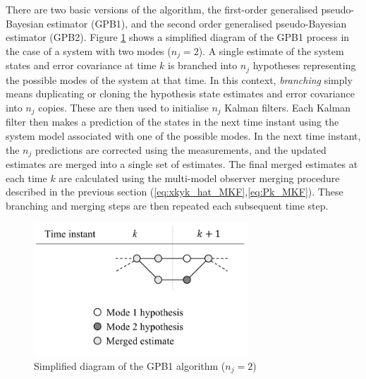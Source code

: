 There are two basic versions of the algorithm, the first-order generalised pseudo-Bayesian estimator (\gls{GPB1}), and the second order generalised pseudo-Bayesian estimator (\gls{GPB2}). Figure \ref{fig:mm-obs-gpb1} shows a simplified diagram of the \gls{GPB1} process in the case of a system with two modes ($n_j=2$). A single estimate of the system states and error covariance at time $k$ is branched into $n_j$ hypotheses representing the possible modes of the system at that time. In this context, \textit{branching} simply means duplicating or cloning the hypothesis state estimates and error covariance into $n_j$ copies. These are then used to initialise $n_j$ Kalman filters. Each Kalman filter then makes a prediction of the states in the next time instant using the system model associated with one of the possible modes. In the next time instant, the $n_j$ predictions are corrected using the measurements, and the updated estimates are merged into a single set of estimates. The final merged estimates at each time $k$ are calculated using the multi-model observer merging procedure described in the previous section (\ref{eq:xkyk_hat_MKF},\ref{eq:Pk_MKF}). These branching and merging steps are then repeated each subsequent time step.

\begin{figure}[htp]
	\centering
	\includegraphics[height=5cm]{images/mm_obs_seq_gpb1.pdf}
	\caption{Simplified diagram of the \gls{GPB1} algorithm ($n_j=2$)}
	\label{fig:mm-obs-gpb1}
\end{figure}

